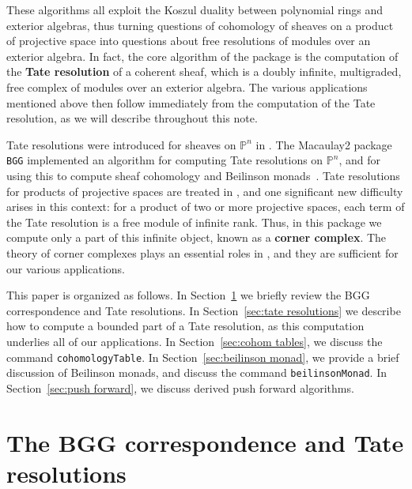 \documentclass[twoside,12pt, leqno]{amsart}
\def\PP{{\mathbb P}}
\begin{document}
These algorithms all exploit the Koszul duality between polynomial rings and exterior algebras, thus turning questions of cohomology of sheaves on a product of projective space into questions about free resolutions of modules over an exterior algebra.  In fact, the core algorithm of the package is the computation of the {\bf Tate resolution} of a coherent sheaf, which is a doubly infinite, multigraded, free complex of modules over an exterior algebra.  The various applications mentioned above then follow immediately from the computation of the Tate resolution, as we will describe throughout this note.

Tate resolutions were introduced for sheaves on $\PP^n$ in \cite{EFS}.  The Macaulay2 package {\tt BGG} implemented an algorithm for computing Tate resolutions on $\PP^n$, and for using this to compute sheaf cohomology and Beilinson monads~\cite{M2-BGG}.  Tate resolutions for products of projective spaces are treated in \cite{EES}, and one significant new difficulty arises in this context: for a product of two or more projective spaces, each term of the Tate resolution is a free module of infinite rank.  Thus, in this package we compute only a part of this infinite object, known as a {\bf corner complex}.  The theory of corner complexes plays an essential roles in \cite{EES}, and they are sufficient for our various applications.

This paper is organized as follows.  In Section~\ref{sec:background} we briefly review the BGG correspondence and Tate resolutions.  In Section~\ref{sec:tate resolutions} we describe how to compute a bounded part of a Tate resolution, as this computation underlies all of our applications.  In Section~\ref{sec:cohom tables}, we discuss the command {\tt cohomologyTable}.  
 In Section~\ref{sec:beilinson monad}, we provide a brief discussion of Beilinson monads, and discuss the command {\tt beilinsonMonad}.  In Section~\ref{sec:push forward}, we discuss derived push forward algorithms.
 
%

\section{The BGG correspondence and Tate resolutions}\label{sec:background}
\end{document}
